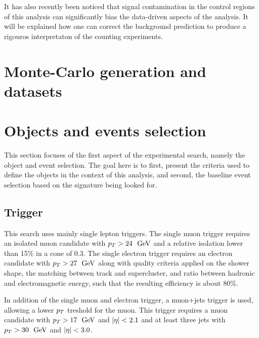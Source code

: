     It has also recently been noticed that signal contamination in the control regions of
    this analysis can significantly bias the data-driven aspects of the analysis. It will
    be explained how one can correct the background prediction to produce a rigouros
    interpretaton of the counting experiments.


    \section{Monte-Carlo generation and datasets}
    
    \todo{} 

    \section{Objects and events selection \label{sec:analysis_objectAndEventSelection}}

    This section focuses of the first aspect of the experimental search, namely the object 
    and event selection. The goal here is to first, present the criteria used to define the
    objects in the context of this analysis, and second, the baseline event selection based 
    on the signature being looked for.

        \subsection{Trigger}

    
    This search uses mainly single lepton triggers. The single muon trigger requires an isolated muon candidate
    with $p_T > 24~~\text{GeV}$ and a relative isolation lower than 15\% in a cone of 0.3. The single electron trigger
    requires an electron candidate with $p_T > 27~~\text{GeV}$ along with quality criteria applied on the shower shape,
    the matching between track and supercluster, and ratio between hadronic and electromagnetic energy, such that
    the resulting efficiency is about 80\%.

    In addition of the single muon and electron trigger, a muon+jets trigger is used, allowing a lower $p_T$ treshold
    for the muon. This trigger requires a muon candidate with $p_T > 17~~\text{GeV}$ and $\left| \eta \right| < 2.1$ and at least three 
    jets with $p_T > 30~~\text{GeV}$ and $\left| \eta \right| < 3.0$.

